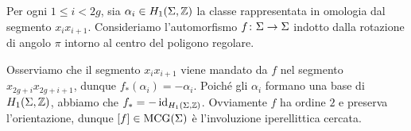 Per ogni $1\le i<2g$, sia $\alpha_i\in H_1(\Sigma,\mathbb{Z})$ la classe rappresentata in omologia dal segmento $x_ix_{i+1}$. Consideriamo l'automorfismo $\map{f}{\Sigma}{\Sigma}$ indotto dalla rotazione di angolo $\pi$ intorno al centro del poligono regolare.

\begin{center}
\end{center}

Osserviamo che il segmento $x_ix_{i+1}$ viene mandato da $f$ nel segmento $x_{2g+i}x_{2g+i+1}$, dunque $f_*(\alpha_i)=-\alpha_i$. Poiché gli $\alpha_i$ formano una base di $H_1(\Sigma,\mathbb{Z})$, abbiamo che $f_*=-\operatorname{id}_{H_1(\Sigma,\mathbb{Z})}$. Ovviamente $f$ ha ordine $2$ e preserva l'orientazione, dunque $[f]\in\operatorname{MCG}(\Sigma)$ è l'involuzione iperellittica cercata.

\begin{comment}
\newpage
\subsection*{Esercizio 3.6}
Siano $[f]\in\MCG(S_g)$, $[m]\in\Teich(S_g)$ tali che $[f_*m]=[m]$. Ciò significa che esiste un diffeomorfismo $h$ di $S_g$ isotopo all'identità e tale che $f_*m=h_*m$. Ma allora $(h^{-1}\circ f)_*m=m$; poiché $h^{-1}\circ f$ e $f$ sono isotopi, essi rappresentano la stessa classe in $\MCG(S_g)$, dunque possiamo supporre (a meno di cambiare rappresentante) che $f_*m=m$. Ciò significa precisamente che $f$ è un'isometria per la superficie $S_g$ con la metrica $m$.

I punti singolari dello spazio dei moduli sono precisamente le (classi di) metriche che sono fissate da elementi non banali di $\MCG(S_g)$. Come abbiamo visto, se elemento $\varphi\in\MCG(S_g)$ fissa una classe $[m]\in\Teich(S_g)$, allora esiste un rappresentante $f$ di $\varphi$ (che non sarà isotopo all'identità se $\varphi$ è non banale) che è un'isometria per $S_g$ munita della metrica $m$.
\end{comment}